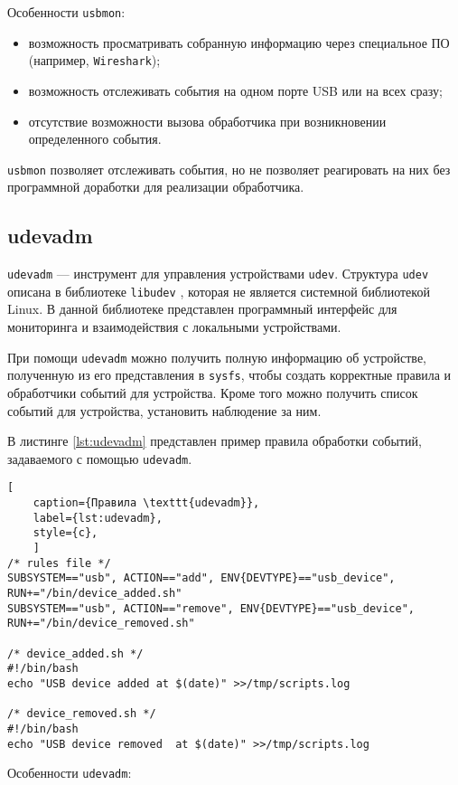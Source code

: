 Особенности \texttt{usbmon}:

\begin{itemize}
	\item возможность просматривать собранную информацию через специальное ПО (например, \texttt{Wireshark});
	\item возможность отслеживать события на одном порте USB или на всех сразу;
	\item отсутствие возможности вызова обработчика при возникновении определенного события.
\end{itemize}

\texttt{usbmon} позволяет отслеживать события, но не позволяет реагировать на них без программной доработки для реализации обработчика.

\subsection{udevadm}

\texttt{udevadm} \cite{udevadm} --- инструмент для управления устройствами \texttt{udev}. Структура \texttt{udev} описана в библиотеке \texttt{libudev} \cite{libudev}, которая не является системной библиотекой Linux. В данной библиотеке представлен программный интерфейс для мониторинга и взаимодействия с локальными устройствами.

При помощи \texttt{udevadm} можно получить полную информацию об устройстве, полученную из его представления в \texttt{sysfs}, чтобы создать корректные правила и обработчики событий для устройства. Кроме того можно получить список событий для устройства, установить наблюдение за ним.

В листинге \ref{lst:udevadm} представлен пример правила обработки событий, задаваемого с помощью \texttt{udevadm}.

\begin{lstlisting}[
	caption={Правила \texttt{udevadm}},
	label={lst:udevadm},
	style={c},
	]
/* rules file */
SUBSYSTEM=="usb", ACTION=="add", ENV{DEVTYPE}=="usb_device",  RUN+="/bin/device_added.sh"
SUBSYSTEM=="usb", ACTION=="remove", ENV{DEVTYPE}=="usb_device", RUN+="/bin/device_removed.sh"

/* device_added.sh */
#!/bin/bash
echo "USB device added at $(date)" >>/tmp/scripts.log

/* device_removed.sh */
#!/bin/bash
echo "USB device removed  at $(date)" >>/tmp/scripts.log
\end{lstlisting}

Особенности \texttt{udevadm}:

